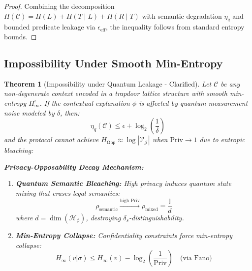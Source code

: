 \documentclass[preprint,12pt]{elsarticle}
\newtheorem{theorem}{Theorem}[section]
\begin{document}
            \begin{proof}\label{pr:entropy_bound}
                Combining the decomposition $H(\mathcal{C}) = H(L) + H(T \mid L) + H(R \mid T)$ with semantic degradation $\eta_q$ and bounded predicate leakage via $\epsilon_{\mathrm{eff}}$, the inequality follows from standard entropy bounds.
            \end{proof}

        \subsection{Impossibility Under Smooth Min-Entropy}

            \begin{theorem}[Impossibility under Quantum Leakage - Clarified]\label{thm:impossibility_etaq}
                Let $\mathcal{C}$ be any non-degenerate context encoded in a trapdoor lattice structure with smooth min-entropy $H_\infty^\epsilon$. If the contextual explanation $\phi$ is affected by quantum measurement noise modeled by $\delta$, then:
                \begin{equation}\label{eq:impossibility_etaq}
                    \eta_q(\mathcal{C}) \leq \epsilon + \log_2 \left(\frac{1}{\delta}\right)
                \end{equation}
                and the protocol cannot achieve $H_{\mathsf{Opp}} \approx \log |\mathcal{V}_{\mathcal{J}}|$ when $\mathrm{Priv} \to 1$ due to \textit{entropic bleaching}:
                
                \vspace{5pt}
                \noindent\textbf{Privacy-Opposability Decay Mechanism:}
                \begin{enumerate}
                    \item \textbf{Quantum Semantic Bleaching:}
                    High privacy induces quantum state mixing that erases legal semantics:
                    \[
                    \rho_{\text{semantic}} \xrightarrow{\text{high Priv}} \rho_{\text{mixed}} = \frac{\mathbb{I}}{d}
                    \]
                    where $d = \dim(\mathcal{H}_\phi)$, destroying $\delta_s$-distinguishability.
                    
                    \item \textbf{Min-Entropy Collapse:}
                    Confidentiality constraints force min-entropy collapse:
                    \[
                    H_\infty(v|\sigma) \leq H_\infty(v) - \log_2\left(\frac{1}{\mathrm{Priv}}\right) \quad \text{(via Fano)}
                    \]
                    

\end{enumerate}
\end{theorem}
\end{document}
